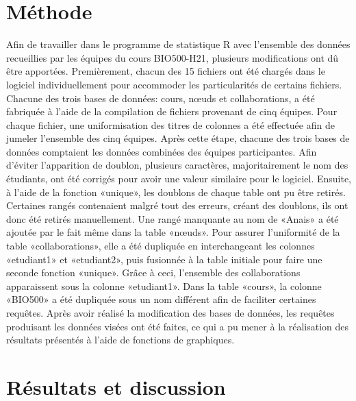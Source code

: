 \documentclass[12pt]{article}
\begin{document}
\begin{multicols}{2}
\section{Méthode}
Afin de travailler dans le programme de statistique R avec l’ensemble des données recueillies par les équipes du cours BIO500-H21, plusieurs modifications ont dû être apportées. Premièrement, chacun des 15 fichiers ont été chargés dans le logiciel individuellement pour accommoder les particularités de certains fichiers. Chacune des trois bases de données: cours, nœuds et collaborations, a été fabriquée à l’aide de la compilation de fichiers provenant de cinq équipes. Pour chaque fichier, une uniformisation des titres de colonnes a été effectuée afin de jumeler l’ensemble des cinq équipes. Après cette étape, chacune des trois bases de données comptaient les données combinées des équipes participantes.  Afin d’éviter l’apparition de doublon, plusieurs caractères, majoritairement le nom des étudiants, ont été corrigés pour avoir une valeur similaire pour le logiciel. Ensuite, à l’aide de la fonction «unique», les doublons de chaque table ont pu être retirés. Certaines rangés contenaient malgré tout des erreurs, créant des doublons, ils ont donc été retirés manuellement. Une rangé manquante au nom de «Anais» a été ajoutée par le fait même dans la table «nœuds». Pour assurer l’uniformité de la table «collaborations», elle a été dupliquée en interchangeant les colonnes «etudiant1» et «etudiant2», puis fusionnée à la table initiale pour faire une seconde fonction «unique». Grâce à ceci, l’ensemble des collaborations apparaissent sous la colonne «etudiant1». Dans la table «cours», la colonne «BIO500» a été dupliquée sous un nom différent afin de faciliter certaines requêtes. Après avoir réalisé la modification des bases de données, les requêtes produisant les données visées ont été faites, ce qui a pu mener à la réalisation des résultats présentés à l’aide de fonctions de graphiques.  
\section{Résultats et discussion}

\end{multicols}
\end{document}
